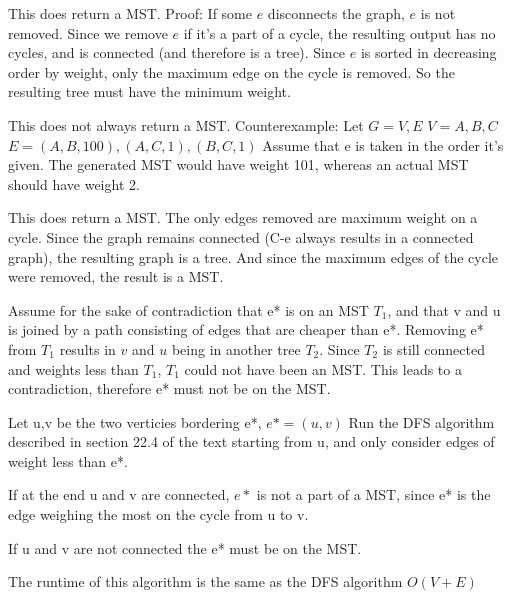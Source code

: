 \documentclass[12pt]{article}
\newenvironment{question}[2][Question]{\begin{trivlist}
		\item[\hskip \labelsep {\bfseries #1}\hskip \labelsep {\bfseries #2.}]}{\end{trivlist}}
\begin{document}
	\begin{question}{2a}
		
		This does return a MST. Proof: If some $e$ disconnects the graph, $e$ is not removed. Since we remove $e$ if it's a part of a cycle, the resulting output has no cycles, and is connected (and therefore is a tree). Since $e$ is sorted in decreasing order by weight, only the maximum edge on the cycle is removed. So the resulting tree must have the minimum weight. 
		
	\end{question}
\begin{question}{2b}
This does not always return a MST. Counterexample: Let $G={V,E}$ $V={A, B, C}$ $E={(A, B, 100), (A, C, 1), (B, C, 1)}$
Assume that e is taken in the order it's given. The generated MST would have weight 101, whereas an actual MST should have weight 2.

\end{question}
		\begin{question}{2c}
	This does return a MST. The only edges removed are maximum weight on a cycle. Since the graph remains connected (C-e always results in a connected graph), the resulting graph is a tree. And since the maximum edges of the cycle were removed, the result is a MST.
	\end{question}

\begin{question}{3a}
	Assume for the sake of contradiction that e* is on an MST $T_1$, and that v and u is joined by a path consisting of edges that are cheaper than e*. Removing e* from $T_1$ results in $v$ and $u$ being in another tree $T_2$. Since $T_2$ is still connected and weights less than $T_1$, $T_1$ could not have been an MST. This leads to a contradiction, therefore e* must not be on the MST.
\end{question}
	\begin{question}{3b}
	Let u,v be the two verticies bordering e*, $e*=(u,v)$
	Run the DFS algorithm described in section 22.4 of the text starting from u, and only consider edges of weight less than e*.
	
	If at the end u and v are connected, $e*$ is not a part of a MST, since e* is the edge weighing the most on the cycle from u to v.
	
	If u and v are not connected the e* must be on the MST. 
	
	The runtime of this algorithm is the same as the DFS algorithm $O(V+E)$
\end{question}
\end{document}
